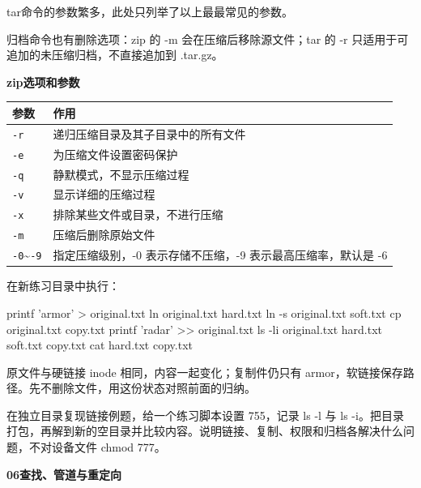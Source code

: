 tar命令的参数繁多，此处只列举了以上最最常见的参数。


\begin{table}[H]\centering
\begin{note}
归档命令也有删除选项：zip 的 -m 会在压缩后移除源文件；tar 的 -r 只适用于可追加的未压缩归档，不直接追加到 .tar.gz。
\end{note}
\textbf{zip\enspace 选项和参数}

	\begin{tabular}{p{}p{}}
		\toprule[1.5pt]
		参数 & 作用\\
		\midrule[1pt]
		\texttt{-r}		&递归压缩目录及其子目录中的所有文件\\
		\texttt{-e}		&为压缩文件设置密码保护\\
		\texttt{-q}		&静默模式，不显示压缩过程 \\
		\texttt{-v}		&显示详细的压缩过程 \\
		\texttt{-x}		&排除某些文件或目录，不进行压缩 \\
		\texttt{-m}		&压缩后删除原始文件 \\
		\texttt{-0}\enspace \textasciitilde\enspace \texttt{-9}		&指定压缩级别，-0 表示存储不压缩，-9 表示最高压缩率，默认是 -6 \\
		\bottomrule[1.5pt]
	\end{tabular}
\end{table}


\begin{example}
在新练习目录中执行：


\begin{tbash}
printf 'armor\n' > original.txt
ln original.txt hard.txt
ln -s original.txt soft.txt
cp original.txt copy.txt
printf 'radar\n' >> original.txt
ls -li original.txt hard.txt soft.txt copy.txt
cat hard.txt copy.txt
\end{tbash}


原文件与硬链接 inode 相同，内容一起变化；复制件仍只有 armor，软链接保存路径。先不删除文件，用这份状态对照前面的归纳。
\end{example}
\begin{exercise}\label{ex:v1-links-permissions-archive}
在独立目录复现链接例题，给一个练习脚本设置 755，记录 ls -l 与 ls -i。把目录打包，再解到新的空目录并比较内容。说明链接、复制、权限和归档各解决什么问题，不对设备文件 chmod 777。
\end{exercise}
\textbf{06查找、管道与重定向}


